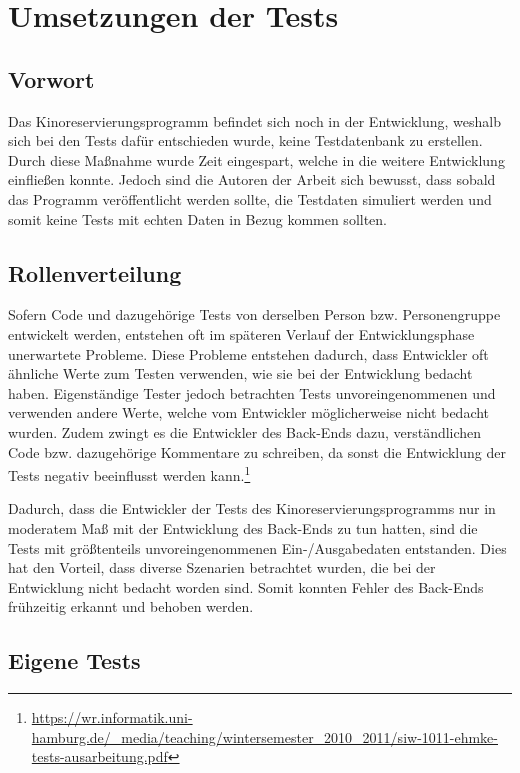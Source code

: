\section{Umsetzungen der Tests}
\authorsection{\authorRF}

\subsection{Vorwort}

Das Kinoreservierungsprogramm befindet sich noch in der Entwicklung, weshalb sich bei den Tests dafür entschieden wurde, keine Testdatenbank zu erstellen.
Durch diese Maßnahme wurde Zeit eingespart, welche in die weitere Entwicklung einfließen konnte.
Jedoch sind die Autoren der Arbeit sich bewusst, dass sobald das Programm veröffentlicht werden sollte, die Testdaten simuliert werden und somit keine Tests mit echten Daten in Bezug kommen sollten.

\subsection{Rollenverteilung}

Sofern Code und dazugehörige Tests von derselben Person bzw. Personengruppe entwickelt werden, entstehen oft im späteren Verlauf der Entwicklungsphase unerwartete Probleme.
Diese Probleme entstehen dadurch, dass Entwickler oft ähnliche Werte zum Testen verwenden, wie sie bei der Entwicklung bedacht haben.
Eigenständige Tester jedoch betrachten Tests unvoreingenommenen und verwenden andere Werte, welche vom Entwickler möglicherweise nicht bedacht wurden.
Zudem zwingt es die Entwickler des Back-Ends dazu, verständlichen Code bzw. dazugehörige Kommentare zu schreiben, da sonst die Entwicklung der Tests negativ beeinflusst werden kann.\footnote{\url{https://wr.informatik.uni-hamburg.de/_media/teaching/wintersemester_2010_2011/siw-1011-ehmke-tests-ausarbeitung.pdf}}

Dadurch, dass die Entwickler der Tests des Kinoreservierungsprogramms nur in moderatem Maß mit der Entwicklung des Back-Ends zu tun hatten, sind die Tests mit größtenteils unvoreingenommenen Ein-/Ausgabedaten entstanden.
Dies hat den Vorteil, dass diverse Szenarien betrachtet wurden, die bei der Entwicklung nicht bedacht worden sind.
Somit konnten Fehler des Back-Ends frühzeitig erkannt und behoben werden.


\subsection{Eigene Tests}

